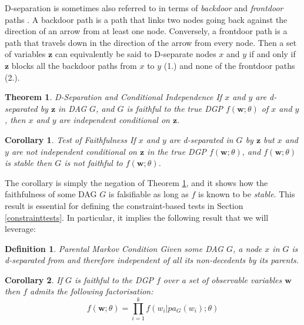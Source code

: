\documentclass{article}
\newtheorem{definition}{Definition}
\newtheorem{corollary}{Corollary}
\newtheorem{theorem}{Theorem}
\begin{document}
D-separation is sometimes also referred to in terms of \textit{backdoor} and \textit{frontdoor} paths \parencite{pearl2009causality}. A backdoor path is a path that links two nodes going back against the direction of an arrow from at least one node. Conversely, a frontdoor path is a path that travels down in the direction of the arrow from every node. Then a set of variables $\mathbf{z}$ can equivalently be said to D-separate nodes $x$ and $y$ if and only if $\mathbf{z}$ blocks all the backdoor paths from $x$ to $y$ (1.) and none of the frontdoor paths (2.).
 
\theoremstyle{theorem}
\begin{theorem}{D-Separation and Conditional Independence}
  If $x$ and $y$ are d-separated by $\mathbf{z}$ in DAG $G$, and $G$ is faithful to the true DGP $f(\mathbf{w};\theta)$ of $x$ and $y$, then $x$ and $y$ are independent conditional on $\mathbf{z}$. 
  \parencite[p.18]{pearl2009causality}
  \label{dseptheorem}
\end{theorem}

\theoremstyle{corollary}
\begin{corollary}{Test of Faithfulness}
  If $x$ and $y$ are d-separated in $G$ by $\mathbf{z}$ but $x$ and $y$ are not independent conditional on $\mathbf{z}$ in the true DGP $f(\mathbf{w};\theta)$, and $f(\mathbf{w};\theta)$ is stable then $G$ is not faithful to $f(\mathbf{w};\theta)$.
  \label{faithful_corollary}
\end{corollary}

The corollary is simply the negation of Theorem \ref{dseptheorem}, and it shows how the faithfulness of some DAG $G$ is falsifiable as long as $f$ is known to be \textit{stable}. This result is essential for defining the constraint-based tests in Section \ref{constrainttests}. In particular, it implies the following result that we will leverage:

\theoremstyle{corollary}
\begin{definition}{Parental Markov Condition}
  Given some DAG $G$, a node $x$ in $G$ is d-separated from and therefore independent of all its non-decedents by its parents. 
  \parencite[p.16, p.19]{pearl2009causality}
  \label{markovcompatibility}
\end{definition}

\theoremstyle{corollary}
\begin{corollary}
  If $G$ is faithful to the DGP $f$ over a set of observable variables $\mathbf{w}$ then $f$ admits the following factorisation:
  \begin{equation}
    f(\mathbf{w};\theta) = \prod_{i=1}^{k} f(w_i | pa_G(w_i);\theta)
  \end{equation} \parencite[p.16]{pearl2009causality}
\end{corollary}
\end{document}
